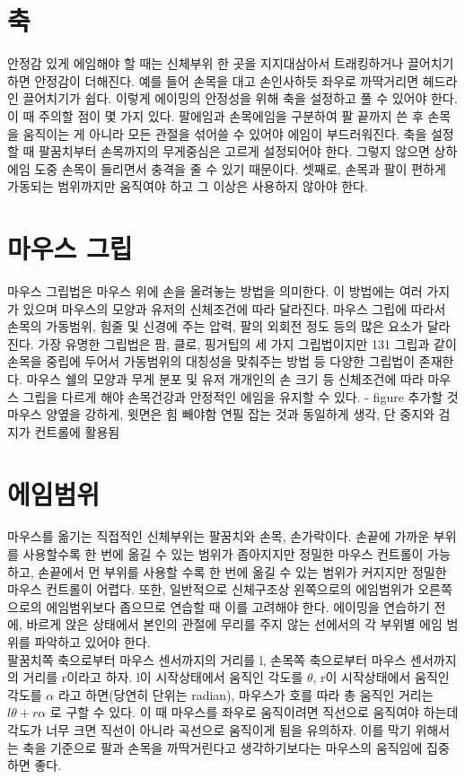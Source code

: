 \section{축}
안정감 있게 에임해야 할 때는 신체부위 한 곳을 지지대삼아서 트래킹하거나 끌어치기하면 안정감이 더해진다. 예를 들어 손목을 대고 손인사하듯 좌우로 까딱거리면 헤드라인 끌어치기가 쉽다. 이렇게 에이밍의 안정성을 위해 축을 설정하고 풀 수 있어야 한다. 이 때 주의할 점이 몇 가지 있다. 팔에임과 손목에임을 구분하여 팔 끝까지 쓴 후 손목을 움직이는 게 아니라 모든 관절을 섞어쓸 수 있어야 에임이 부드러워진다. 축을 설정할 때 팔꿈치부터 손목까지의 무게중심은 고르게 설정되어야 한다. 그렇지 않으면 상하에임 도중 손목이 들리면서 충격을 줄 수 있기 때문이다. 셋째로, 손목과 팔이 편하게 가동되는 범위까지만 움직여야 하고 그 이상은 사용하지 않아야 한다.

\section{마우스 그립}
마우스 그립법은 마우스 위에 손을 올려놓는 방법을 의미한다. 이 방법에는 여러 가지가 있으며 마우스의 모양과 유저의 신체조건에 따라 달라진다.
마우스 그립에 따라서 손목의 가동범위, 힘줄 및 신경에 주는 압력, 팔의 외회전 정도 등의 많은 요소가 달라진다. 가장 유명한 그립법은 팜, 클로, 핑거팁의 세 가지 그립법이지만 131 그립과 같이 손목을 중립에 두어서 가동범위의 대칭성을 맞춰주는 방법 등 다양한 그립법이 존재한다. 마우스 쉘의 모양과 무게 분포 및 유저 개개인의 손 크기 등 신체조건에 따라 마우스 그립을 다르게 해야 손목건강과 안정적인 에임을 유지할 수 있다.
- figure 추가할 것
마우스 양옆을 강하게, 윗면은 힘 빼야함 연필 잡는 것과 동일하게 생각, 단 중지와 검지가 컨트롤에 활용됨


\section{에임범위}
마우스를 옮기는 직접적인 신체부위는 팔꿈치와 손목, 손가락이다. 손끝에 가까운 부위를 사용할수록 한 번에 옮길 수 있는 범위가 좁아지지만 정밀한 마우스 컨트롤이 가능하고, 손끝에서 먼 부위를 사용할 수록 한 번에 옮길 수 있는 범위가 커지지만 정밀한 마우스 컨트롤이 어렵다. 또한, 일반적으로 신체구조상 왼쪽으로의 에임범위가 오른쪽으로의 에임범위보다 좁으므로 연습할 때 이를 고려해야 한다. 에이밍을 연습하기 전에, 바르게 앉은 상태에서 본인의 관절에 무리를 주지 않는 선에서의 각 부위별 에임 범위를 파악하고 있어야 한다.\\
 팔꿈치쪽 축으로부터 마우스 센서까지의 거리를 l,  손목쪽 축으로부터 마우스 센서까지의 거리를 r이라고 하자. l이 시작상태에서 움직인 각도를 $\theta$, r이 시작상태에서 움직인 각도를 $\alpha$ 라고 하면(당연히 단위는 radian), 마우스가 호를 따라 총 움직인 거리는 $l\theta+r\alpha$ 로 구할 수 있다. 이 때 마우스를 좌우로 움직이려면 직선으로 움직여야 하는데 각도가 너무 크면 직선이 아니라 곡선으로 움직이게 됨을 유의하자. 이를 막기 위해서는 축을 기준으로 팔과 손목을 까딱거린다고 생각하기보다는 마우스의 움직임에 집중하면 좋다.




